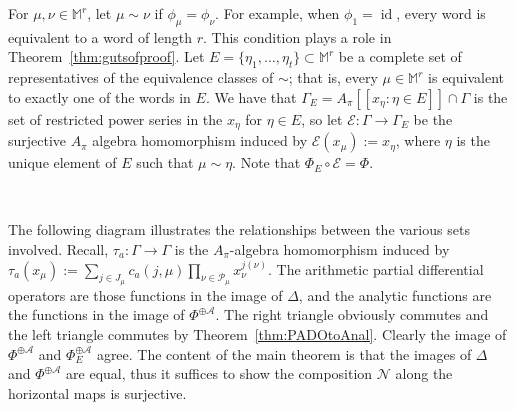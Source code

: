 \documentclass[10pt]{amsart}
\theoremstyle{Theorem}
\theoremstyle{definition}
\newcommand{\id}{\operatorname{id}}
\newcommand{\cA}{\mathcal{A}}
\newcommand{\cE}{\mathcal{E}}
\def\cN{\mathcal{N}}
\begin{document}
For $\mu,\nu\in \mathbb M^r$, let $\mu\sim \nu$ if $\phi_\mu = \phi_\nu$. For example, when $\phi_1 = \id$, every word is equivalent to a word of length $r$. This condition plays a role in Theorem~\ref{thm:gutsofproof}. Let $E=\{\eta_1,\ldots, \eta_t\}\subset \mathbb M^{r}$ be a complete set of representatives of the equivalence classes of $\sim$; that is, every $\mu\in \mathbb M^r$ is equivalent to exactly one of the words in $E$.  We have that $\Gamma_E = A_\pi[[x_{\eta}\colon \eta\in E]]\cap \Gamma$ is the set of restricted power series in the $x_\eta$ for $\eta\in E$, so let $\cE:\Gamma\to \Gamma_E$ be the surjective $A_\pi$ algebra homomorphism induced by $\cE(x_\mu) := x_{\eta}$, where $\eta$ is the unique element of $E$ such that $\mu \sim \eta$.  Note that $\Phi_E\circ \cE = \Phi$.  

\ 

The following diagram illustrates the relationships between the various sets involved. Recall, $\tau_a \colon \Gamma\to \Gamma$ is the $A_\pi$-algebra homomorphism induced by $\tau_a(x_\mu) := \sum_{j \in J_\mu} c_a(j,\mu) \prod_{\nu \in \mathcal{P}_\mu} x_\nu^{j(\nu)}$. The arithmetic partial differential operators are those functions in the image of $\Delta$, and the analytic functions are the functions in the image of $\Phi^{\oplus \cA}$. The right triangle obviously commutes and the left triangle commutes by Theorem~\ref{thm:PADOtoAnal}. Clearly the image of $\Phi^{\oplus \cA}$ and $\Phi_E^{\oplus \cA}$ agree. The content of the main theorem is that the images of $\Delta$ and $\Phi^{\oplus \cA}$ are equal, thus it suffices to show the composition $\cN$ along the horizontal maps is surjective.

\begin{center}
\end{center}
\end{document}
